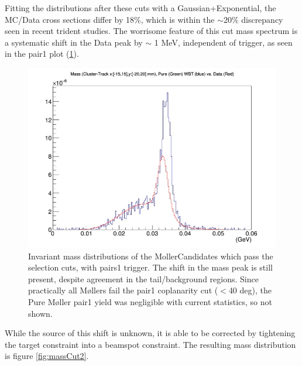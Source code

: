 \documentclass{article}
\begin{document}
Fitting the distributions after these cuts with a Gaussian+Exponential, the MC/Data cross sections differ by 18\%, which is within the $\sim 20\%$ discrepancy seen in recent trident studies. The worrisome feature of this cut mass spectrum is a systematic shift in the Data peak by $\sim$ 1 MeV, independent of trigger, as seen in the pair1 plot (\ref{fig:massCut1Pairs}).

\begin{figure}[H]
  	\includegraphics[width=\linewidth]{MollerPlots/massWithMatchingPairs}
  	\caption{Invariant mass distributions of the MollerCandidates which pass the selection cuts, with pairs1 trigger. The shift in the mass peak is still present, despite agreement in the tail/background regions. Since practically all M\o llers fail the pair1 coplanarity cut ($<$40 deg), the Pure M\o ller pair1 yield was negligible with current statistics, so not shown.}
  	\label{fig:massCut1Pairs}
	\end{figure}

While the source of this shift is unknown, it is able to be corrected by tightening the target constraint into a beamspot constraint. The resulting mass distribution is figure \ref{fig:massCut2}.
\end{document}
